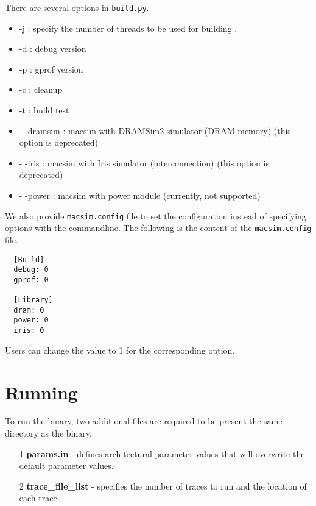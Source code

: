There are several options in \Verb+build.py+.

\begin{itemize}
  \item -j : specify the number of threads to be used for building \SIM.
  \item -d : debug version
  \item -p : gprof version
  \item -c : cleanup
  \item -t : build test
  \item - -dramsim : macsim with DRAMSim2 simulator (DRAM memory)
    (this option is deprecated)
  \item - -iris : macsim with Iris simulator (interconnection)  (this option is deprecated)
 
  \item - -power : macsim with power module (currently, not supported) 
\end{itemize}

\noindent
We also provide \Verb+macsim.config+ file to set the configuration instead of 
specifying options with the commandline. The following is the content of the 
\Verb+macsim.config+ file.

  \begin{Verbatim}
  [Build]
  debug: 0
  gprof: 0

  [Library]
  dram: 0
  power: 0
  iris: 0
  \end{Verbatim}

\noindent
Users can change the value to 1 for the corresponding option.

\section{Running \SIM}
\label{sec:run}

To run the \bin binary, two additional files are required to be present 
the same directory as the binary.

\begin{itemize}
  \item[1] \textbf{params.in} - defines architectural parameter values that will
  overwrite the default parameter values.

  \item[2] \textbf{trace\_file\_list} - specifies the number of traces to run and
  the location of each trace.
\end{itemize}


